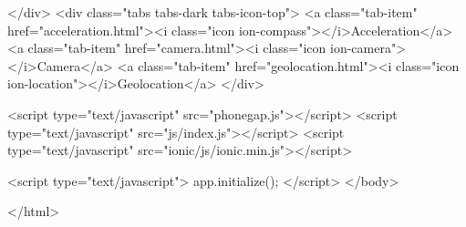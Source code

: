     </div>
    <div class="tabs tabs-dark tabs-icon-top">
        <a class="tab-item" href="acceleration.html"><i class="icon ion-compass"></i>Acceleration</a>
        <a class="tab-item" href="camera.html"><i class="icon ion-camera"></i>Camera</a>
        <a class="tab-item" href="geolocation.html"><i class="icon ion-location"></i>Geolocation</a>
    </div>

    <script type="text/javascript" src="phonegap.js"></script>
    <script type="text/javascript" src="js/index.js"></script>
    <script type="text/javascript" src="ionic/js/ionic.min.js"></script>

    <script type="text/javascript">
        app.initialize();
    </script>
</body>

</html>

